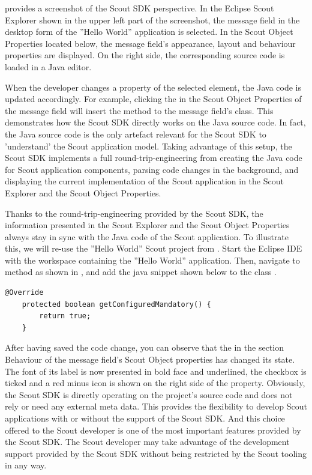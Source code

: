 \documentclass[a4paper,10pt,twoside]{book}
\begin{document}
 provides a screenshot of the Scout SDK perspective. 
In the Eclipse Scout Explorer shown in the upper left part of the screenshot, the message field in the desktop form of the ''Hello World'' application is selected. 
In the Scout Object Properties located below, the message field's appearance, layout and behaviour properties are displayed. 
On the right side, the corresponding source code is loaded in a Java editor. 

When the developer changes a property of the selected element, the Java code is updated accordingly. 
For example, clicking the  in the Scout Object Properties of the message field will insert the method  to the message field's class. 
This demonstrates how the Scout SDK directly works on the Java source code. 
In fact, the Java source code is the only artefact relevant for the Scout SDK to 'understand' the Scout application model. 
Taking advantage of this setup, the Scout SDK implements a full round-trip-engineering from creating the Java code for Scout application components, parsing code changes in the background, and displaying the current implementation of the Scout application in the Scout Explorer and the Scout Object Properties.

Thanks to the round-trip-engineering provided by the Scout SDK, the information presented in the Scout Explorer and the Scout Object Properties always stay in sync with the Java code of the Scout application.
To illustrate this, we will re-use the ''Hello World'' Scout project from . 
Start the Eclipse IDE with the workspace containing the ''Hello World'' application.
Then, navigate to method  as shown in , and add the java snippet shown below to the class . 

\begin{lstlisting}[backgroundcolor=\color{white}]
    @Override
    protected boolean getConfiguredMandatory() {
        return true;
    }
\end{lstlisting}

After having saved the code change, you can observe that the  in the section Behaviour of the message field's Scout Object properties has changed its state. 
The font of its label is now presented in bold face and underlined, the checkbox is ticked and a red minus icon is shown on the right side of the property. 
Obviously, the Scout SDK is directly operating on the project's source code and does not rely or need any external meta data. 
This provides the flexibility to develop Scout applications with or without the support of the Scout SDK. 
And this choice offered to the Scout developer is one of the most important features provided by the Scout SDK. 
The Scout developer may take advantage of the development support provided by the Scout SDK without being restricted by the Scout tooling in any way.
\end{document}
